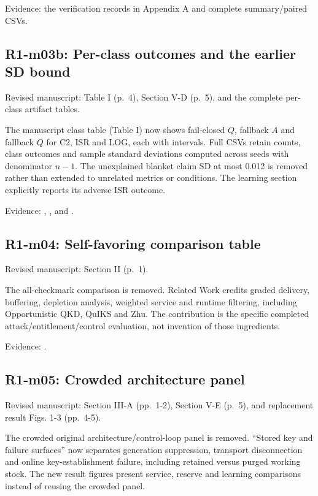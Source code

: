 Evidence: the verification records in Appendix A and complete summary/paired CSVs.

\subsection{R1-m03b: Per-class outcomes and the earlier SD bound}\label{r1-m03b-per-class-outcomes-and-the-earlier-sd-bound}

Revised manuscript: Table I (p.~4), Section V-D (p.~5), and the complete per-class artifact tables.

The manuscript class table (Table I) now shows fail-closed \(Q\), fallback \(A\) and fallback \(Q\) for C2, ISR and LOG, each with intervals. Full CSVs retain counts, class outcomes and sample standard deviations computed across seeds with denominator \(n-1\). The unexplained blanket claim SD at most 0.012 is removed rather than extended to unrelated metrics or conditions. The learning section explicitly reports its adverse ISR outcome.

Evidence: , , and .

\subsection{R1-m04: Self-favoring comparison table}\label{r1-m04-self-favoring-comparison-table}

Revised manuscript: Section II (p.~1).

The all-checkmark comparison is removed. Related Work credits graded delivery, buffering, depletion analysis, weighted service and runtime filtering, including Opportunistic QKD, QuIKS and Zhu. The contribution is the specific completed attack/entitlement/control evaluation, not invention of those ingredients.

Evidence: .

\subsection{R1-m05: Crowded architecture panel}\label{r1-m05-crowded-architecture-panel}

Revised manuscript: Section III-A (pp.~1-2), Section V-E (p.~5), and replacement result Figs. 1-3 (pp.~4-5).

The crowded original architecture/control-loop panel is removed. ``Stored key and failure surfaces'' now separates generation suppression, transport disconnection and online key-establishment failure, including retained versus purged working stock. The new result figures present service, reserve and learning comparisons instead of reusing the crowded panel.

